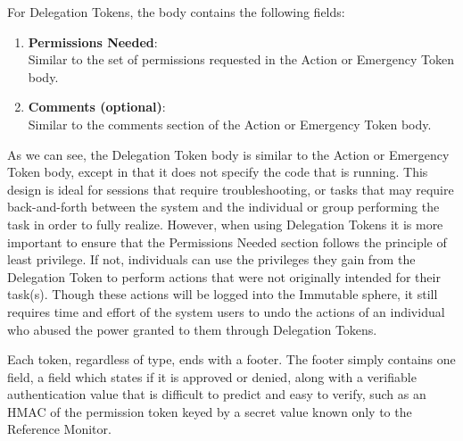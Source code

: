 For Delegation Tokens, the body contains the following fields:
\begin{enumerate}
\item \textbf{Permissions Needed}:\\
Similar to the set of permissions requested in the Action or Emergency Token
body.
\item \textbf{Comments (optional)}:\\
Similar to the comments section of the Action or Emergency Token body.
\end{enumerate}

As we can see, the Delegation Token body is similar to the Action or Emergency
Token body, except in that it does not specify the code that is running. This
design is ideal for sessions that require troubleshooting, or tasks that may
require back-and-forth between the system and the individual or group performing
the task in order to fully realize. However, when using Delegation Tokens it is
more important to ensure that the Permissions Needed section follows the
principle of least privilege. If not, individuals can use the privileges they
gain from the Delegation Token to perform actions that were not originally
intended for their task(s). Though these actions will be logged into the
Immutable sphere, it still requires time and effort of the system users to undo
the actions of an individual who abused the power granted to them through
Delegation Tokens.

Each token, regardless of type, ends with a footer. The footer simply contains
one field, a field which states if it is approved or denied, along with a
verifiable authentication value that is difficult to predict and easy to verify,
such as an HMAC of the permission token keyed by a secret value known only to
the Reference Monitor.

